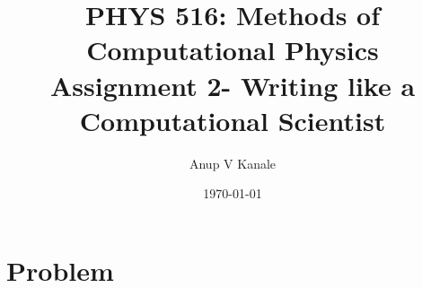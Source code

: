 \documentclass[11pt, oneside]{article}   	%
\title{\large PHYS 516: Methods of Computational Physics \\
  \normalsize Assignment 2- Writing like a Computational Scientist}
\author{Anup V Kanale}
\date{\today}							%
\begin{document}
\maketitle
\section{Problem}
\end{document}

